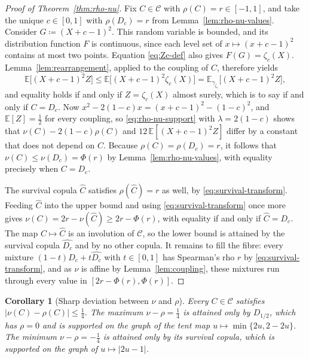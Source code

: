 \documentclass[11pt,a4paper]{article}
\newtheorem{corollary}[theorem]{Corollary}
\theoremstyle{remark}
\newcommand{\E}{\mathbb{E}}
\newcommand{\1}{\mathbf{1}}
\newcommand{\CC}{\mathcal{C}}
\begin{document}
\begin{proof}[Proof of Theorem~\ref{thm:rho-nu}]
Fix $C\in\CC$ with $\rho(C)=r\in[-1,1]$, and take the unique $c\in[0,1]$ with $\rho(D_c)=r$ from Lemma~\ref{lem:rho-nu-values}.
Consider $G\coloneqq(X+c-1)^2$.
This random variable is bounded, and its distribution function $F$ is continuous, since each level set of $x\mapsto(x+c-1)^2$ contains at most two points.
Equation \eqref{eq:Zc-def} also gives $F(G)=\zeta_c(X)$.
Lemma~\ref{lem:rearrangement}, applied to the coupling of $C$, therefore yields
\[
  \E\bigl[(X+c-1)^2Z\bigr]\le\E\bigl[(X+c-1)^2\zeta_c(X)\bigr]=\E_{\gamma_{\zeta_c}}\bigl[(X+c-1)^2Z\bigr],
\]
and equality holds if and only if $Z=\zeta_c(X)$ almost surely, which is to say if and only if $C=D_c$.
Now $x^2-2(1-c)x=(x+c-1)^2-(1-c)^2$, and $\E[Z]=\frac12$ for every coupling, so \eqref{eq:rho-nu-support} with $\lambda=2(1-c)$ shows that $\nu(C)-2(1-c)\rho(C)$ and $12\,\E[(X+c-1)^2Z]$ differ by a constant that does not depend on $C$.
Because $\rho(C)=\rho(D_c)=r$, it follows that $\nu(C)\le\nu(D_c)=\Phi(r)$ by Lemma~\ref{lem:rho-nu-values}, with equality precisely when $C=D_c$.

The survival copula $\widehat C$ satisfies $\rho(\widehat C)=r$ as well, by \eqref{eq:survival-transform}.
Feeding $\widehat C$ into the upper bound and using \eqref{eq:survival-transform} once more gives $\nu(C)=2r-\nu(\widehat C)\ge2r-\Phi(r)$, with equality if and only if $\widehat C=D_c$.
The map $C\mapsto\widehat C$ is an involution of $\CC$, so the lower bound is attained by the survival copula $\widehat{D_c}$ and by no other copula.
It remains to fill the fibre: every mixture $(1-t)D_c+t\widehat{D_c}$ with $t\in[0,1]$ has Spearman's rho $r$ by \eqref{eq:survival-transform}, and as $\nu$ is affine by Lemma~\ref{lem:coupling}, these mixtures run through every value in $[2r-\Phi(r),\Phi(r)]$.
\end{proof}

\begin{corollary}[Sharp deviation between $\nu$ and $\rho$]
\label{cor:nu-rho}
Every $C\in\CC$ satisfies $|\nu(C)-\rho(C)|\le\frac14$.
The maximum $\nu-\rho=\frac14$ is attained only by $D_{1/2}$, which has $\rho=0$ and is supported on the graph of the tent map $u\mapsto\min\{2u,2-2u\}$.
The minimum $\nu-\rho=-\frac14$ is attained only by its survival copula, which is supported on the graph of $u\mapsto|2u-1|$.
\end{corollary}
\end{document}
